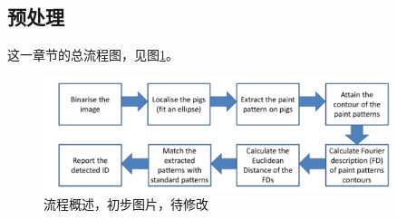 \subsection{预处理}
这一章节的总流程图，见图\ref{fig-steps}。
\begin{figure}[htbp]
    \centering
    \includegraphics[width=0.9\textwidth]{pic/steps.png}
    \caption{流程概述，初步图片，待修改}
    \label{fig-steps}
\end{figure}

